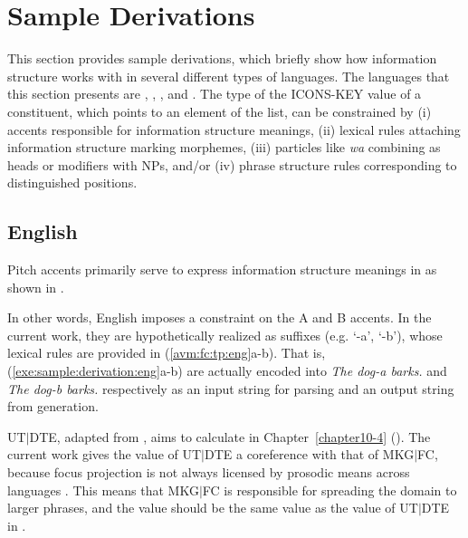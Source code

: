 \section{Sample Derivations}
\label{9:sec:samples}



This section provides sample derivations, which briefly show how
information structure works with  in several different types of
languages. The languages that this section presents are ,
, , and . The type of the
ICONS-KEY value of a constituent, which points to an element of the
 list, can be constrained by (i) accents responsible for
information structure meanings, (ii) lexical rules attaching
information structure marking morphemes, (iii) particles like
 {\it wa} combining as heads or modifiers with NPs,
and/or (iv) phrase structure rules corresponding to distinguished
positions.





\subsection{English}
\label{9:ssec:eng}

Pitch accents primarily serve to express information structure
meanings in  as shown in .


In other words, English imposes a constraint on the A and B
accents. In the current work, they are hypothetically realized as
suffixes (e.g. `-a', `-b'), whose lexical rules are provided in
(\ref{avm:fc:tp:eng}a-b). That is,
(\ref{exe:sample:derivation:eng}a-b) are actually encoded into
\textit{The dog-a barks.} and \textit{The dog-b barks.}  respectively
as an input string for parsing and an output string from generation.




UT{$\mid$}DTE, adapted from \citet{bildhauer:07}, aims to calculate
 in Chapter~\ref{chapter10-4}
(). The current work gives the value of
UT{$\mid$}DTE a coreference with that of MKG{$\mid$}FC, because focus
projection is not always licensed by prosodic means across languages
\citep{choe:02}. This means that MKG{$\mid$}FC is responsible
for spreading the  domain to larger phrases, and the value should
be the same value as the value of UT{$\mid$}DTE in .

